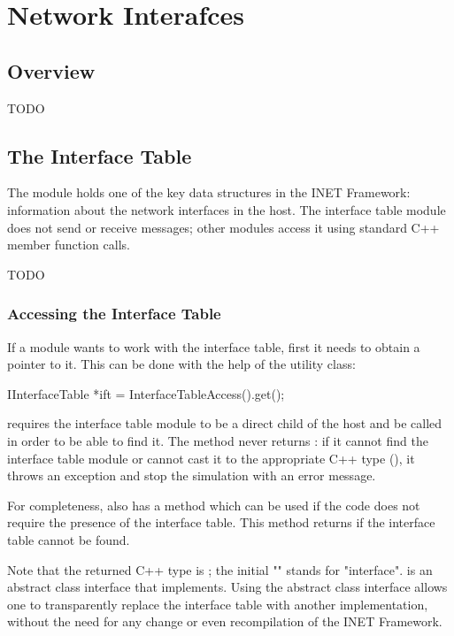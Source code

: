 \chapter{Network Interafces}
\label{cha:network-interfaces}

\section{Overview}

TODO

\section{The Interface Table}

The  module holds one of the key data structures in
the INET Framework: information about the network interfaces in the host.
The interface table module does not send or receive messages; other modules
access it using standard C++ member function calls.

 TODO
\subsection{Accessing the Interface Table}

If a module wants to work with the interface table, first it needs to obtain a
pointer to it. This can be done with the help of the
 utility class:

\begin{cpp}
IInterfaceTable *ift = InterfaceTableAccess().get();
\end{cpp}

 requires the interface table module to be a
direct child of the host and be called  in order to
be able to find it. The  method never returns : if
it cannot find the interface table module or cannot cast it to the
appropriate C++ type (), it throws an exception
and stop the simulation with an error message.

For completeness,  also has a
 method which can be used if the code does not require
the presence of the interface table. This method returns  if the
interface table cannot be found.

Note that the returned C++ type is ; the initial
"" stands for "interface".  is an abstract
class interface that  implements. Using the abstract
class interface allows one to transparently replace the interface table with
another implementation, without the need for any change or even
recompilation of the INET Framework.



